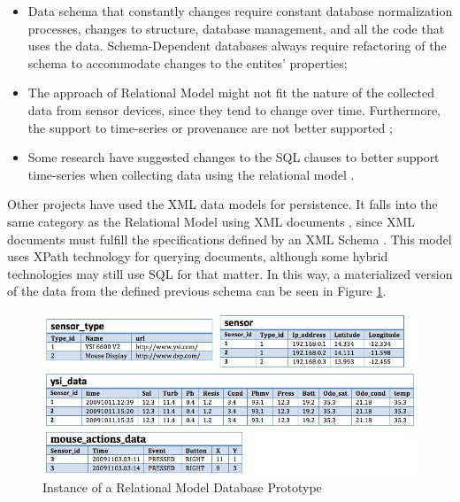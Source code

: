 \begin{itemize}
  \item Data schema that constantly changes require constant database
  normalization processes, changes to structure, database management, and all
  the code that uses the data. Schema-Dependent databases always require
  refactoring of the schema to accommodate changes to the entites' properties;
  \item The approach of Relational Model might not fit the nature of the
  collected data from sensor devices, since they tend to change over time. 
  Furthermore, the support to time-series or provenance are not better
  supported \cite{sn-provenance};
  \item Some research have suggested changes to the SQL clauses to better
  support time-series when collecting data using the relational model 
  \cite{sn-db-newop}.
\end{itemize}

Other projects have used the XML data models for persistence. It falls
into the same category as the Relational Model using XML documents \cite{xml},
since XML documents must fulfill the specifications defined by an XML Schema
\cite{xml-schema}. This model uses XPath \cite{xml-xpath} technology for
querying documents, although some hybrid \cite{db2} technologies may still use
SQL \cite{sql} for that matter. In this way, a materialized version of the
data from the defined previous schema can be seen in Figure
\ref{fig:persistence-example-relational}.

\begin{figure}[!h]
  \centering
  \includegraphics[scale=0.7]{../diagrams/persistence-example-relational}
  \caption{Instance of a Relational Model Database Prototype}
  \label{fig:persistence-example-relational}
\end{figure}

